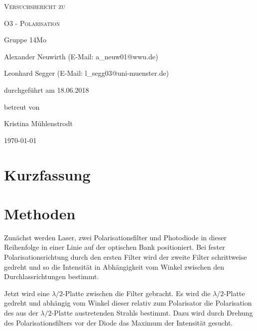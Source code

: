 \documentclass[
	a4paper,
	12pt,
	pagesize,
	ngerman
]{scrartcl}
\begin{document}
	
	\begin{titlepage}
		\centering
		{\scshape\LARGE Versuchsbericht zu \par}
		\vspace{1cm}
		{\scshape\huge O3 - Polarisation \par}
		\vspace{2.5cm}
		{\LARGE Gruppe 14Mo \par}
		\vspace{0.5cm}
		
		{\large Alexander Neuwirth (E-Mail: a\_neuw01@wwu.de) \par}
		{\large Leonhard Segger (E-Mail: l\_segg03@uni-muenster.de) \par}
		\vfill
		
		durchgeführt am 18.06.2018\par
		betreut von\par
		{\large Kristina Mühlenstrodt}
		
		\vfill
		
		{\large \today\par}
	\end{titlepage}
	\tableofcontents
	\newpage


	\section{Kurzfassung}
	
	\section{Methoden}
	Zunächst werden Laser, zwei Polarisationsfilter und Photodiode in dieser Reihenfolge in einer Linie auf der optischen Bank positioniert.
	Bei fester Polarisationsrichtung durch den ersten Filter wird der zweite Filter schrittweise gedreht und so die Intensität in Abhängigkeit vom Winkel zwischen den Durchlassrichtungen bestimmt.
	
	Jetzt wird eine $\lambda /2$-Platte zwischen die Filter gebracht.
	Es wird die $\lambda /2$-Platte gedreht und abhängig vom Winkel dieser relativ zum Polarisator die Polarisation des aus der $\lambda /2$-Platte austretenden Strahls bestimmt.
	Dazu wird durch Drehung des Polarisationsfilters vor der Diode das Maximum der Intensität gesucht.
	
\end{document}
